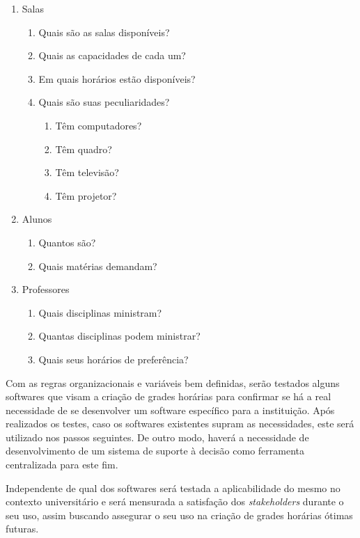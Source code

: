 \begin{enumerate}
    \item Salas
    \begin{enumerate}
        \item Quais são as salas disponíveis?
        \item Quais as capacidades de cada um?
        \item Em quais horários estão disponíveis?
        \item Quais são suas peculiaridades?
        \begin{enumerate}
            \item Têm computadores?
            \item Têm quadro?
            \item Têm televisão?
            \item Têm projetor?
        \end{enumerate}
    \end{enumerate}
    \item Alunos
    \begin{enumerate}
        \item Quantos são?
        \item Quais matérias demandam?
    \end{enumerate}
    \item Professores
    \begin{enumerate}
        \item Quais disciplinas ministram?
        \item Quantas disciplinas podem ministrar?
        \item Quais seus horários de preferência?
    \end{enumerate}
\end{enumerate}

Com as regras organizacionais e variáveis bem definidas, serão testados alguns softwares que visam a criação de grades horárias para confirmar se há a real necessidade de se desenvolver um software específico para a instituição. Após realizados os testes, caso os softwares existentes supram as necessidades, este será utilizado nos passos seguintes. De outro modo, haverá a necessidade de desenvolvimento de um sistema de suporte à decisão como ferramenta centralizada para este fim.

Independente de qual dos softwares será testada a aplicabilidade do mesmo no contexto universitário e será mensurada a satisfação dos \textit{stakeholders} durante o seu uso, assim buscando assegurar o seu uso na criação de grades horárias ótimas futuras.

